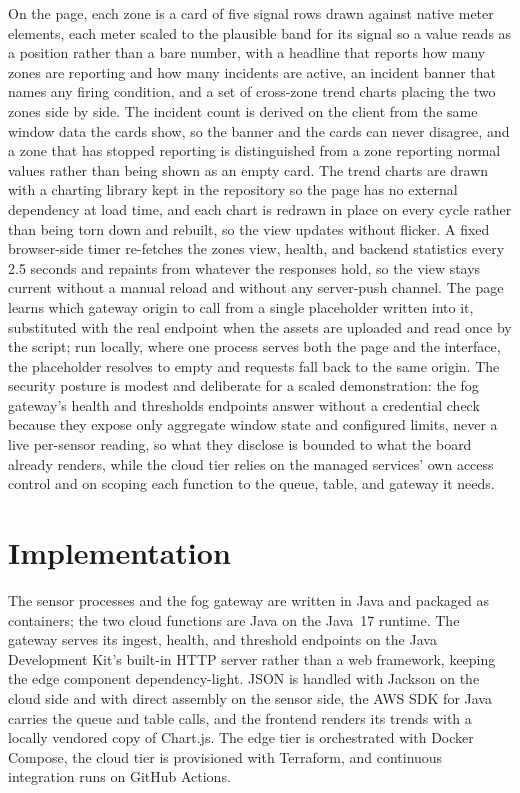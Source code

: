 \documentclass[conference]{IEEEtran}
\begin{document}
On the page, each zone is a card of five signal rows drawn against native meter elements, each meter scaled to the plausible band for its signal so a value reads as a position rather than a bare number, with a headline that reports how many zones are reporting and how many incidents are active, an incident banner that names any firing condition, and a set of cross-zone trend charts placing the two zones side by side. The incident count is derived on the client from the same window data the cards show, so the banner and the cards can never disagree, and a zone that has stopped reporting is distinguished from a zone reporting normal values rather than being shown as an empty card. The trend charts are drawn with a charting library kept in the repository so the page has no external dependency at load time, and each chart is redrawn in place on every cycle rather than being torn down and rebuilt, so the view updates without flicker. A fixed browser-side timer re-fetches the zones view, health, and backend statistics every 2.5 seconds and repaints from whatever the responses hold, so the view stays current without a manual reload and without any server-push channel. The page learns which gateway origin to call from a single placeholder written into it, substituted with the real endpoint when the assets are uploaded and read once by the script; run locally, where one process serves both the page and the interface, the placeholder resolves to empty and requests fall back to the same origin. The security posture is modest and deliberate for a scaled demonstration: the fog gateway's health and thresholds endpoints answer without a credential check because they expose only aggregate window state and configured limits, never a live per-sensor reading, so what they disclose is bounded to what the board already renders, while the cloud tier relies on the managed services' own access control and on scoping each function to the queue, table, and gateway it needs.

\section{Implementation}

The sensor processes and the fog gateway are written in Java and packaged as containers; the two cloud functions are Java on the Java~17 runtime. The gateway serves its ingest, health, and threshold endpoints on the Java Development Kit's built-in HTTP server rather than a web framework, keeping the edge component dependency-light. JSON is handled with Jackson on the cloud side and with direct assembly on the sensor side, the AWS SDK for Java carries the queue and table calls, and the frontend renders its trends with a locally vendored copy of Chart.js. The edge tier is orchestrated with Docker Compose, the cloud tier is provisioned with Terraform, and continuous integration runs on GitHub Actions.
\end{document}

